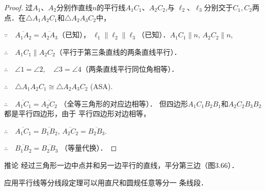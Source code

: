 \begin{proof}
过$A_1$、$A_2$分别作直线$n$的平行线$A_1C_1$、$A_2C_2$,与
$\ell_2$、$\ell_3$分别交于$C_1,C_2$两点．在$\triangle A_1A_2C_1$和$\triangle A_2A_3C_2$中，

$\because\quad \overline{A_1A_2}= \overline{A_2A_3}$（已知），
$\ell_1\parallel \ell_2\parallel \ell_3$（已知）．$A_1C_1\parallel n$,  $A_2C_2\parallel n$,

$\therefore\quad A_1C_1\parallel A_2C_2$（平行于第三条直线的两条直线平行）．

$\therefore\quad \angle 1=\angle 2,\quad \angle 3=\angle 4$（两条直线平行同位角相等）．

$\therefore\quad \triangle A_1A_2C_1\cong \triangle A_2A_3C_2$ (ASA).

$\therefore\quad \overline{A_1C_1}=\overline{A_2C_2}$ （全等三角形的对应边相等）．
但四边形$A_1C_1B_2B_1$和$A_2C_2B_3B_2$都是平行四边形，由于
平行四边形对边相等，

$\therefore\quad \overline{A_1C_1}=\overline{B_1B_2}$, $\overline{A_2C_2}=\overline{B_2B_3}$.

$\therefore\quad \overline{B_1B_2}=\overline{B_2B_3}$ （等量代换）．
\end{proof}    

\begin{blk}
    {推论} 经过三角形一边中点并和另一边平行的直线，平分第三边（图3.66）．
\end{blk}

应用平行线等分线段定理可以用直尺和圆规任意等分一
条线段．

\begin{figure}[htp]\centering
    \begin{minipage}[t]{0.48\textwidth}
    \centering
{}
    \caption{}
    \end{minipage}
    \begin{minipage}[t]{0.48\textwidth}
    \centering
    \caption{}
    \end{minipage}
    \end{figure}

